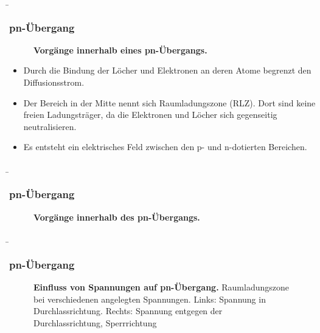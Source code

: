 \begin{frame}
    \b{
    \frametitle{pn-Übergang}
    \begin{figure}[H]
        \centering
        
        \caption{\textbf{Vorgänge innerhalb eines pn-Übergangs.} }  
    \end{figure}
          \begin{itemize}
        \item Durch die Bindung der Löcher und Elektronen an deren Atome begrenzt den Diffusionsstrom.
        \item Der Bereich in der Mitte nennt sich Raumladungszone (RLZ). Dort sind keine freien Ladungsträger, da die Elektronen und Löcher sich gegenseitig neutralisieren.
        \item Es entsteht ein elektrisches Feld zwischen den p- und n-dotierten Bereichen.
    \end{itemize}
    }

\end{frame}

\begin{frame}
    \b{
    \frametitle{pn-Übergang}
    \begin{figure}[H]
        \centering
        
        \caption{\textbf{Vorgänge innerhalb des pn-Übergangs.}}  
    \end{figure}
    }

\end{frame}

\begin{frame}
    \b{
    \frametitle{pn-Übergang}
    \begin{figure}[H]
        \centering
        
        \caption{\textbf{Einfluss von Spannungen auf pn-Übergang.} Raumladungszone bei verschiedenen angelegten Spannungen. Links: Spannung in Durchlassrichtung. Rechts: Spannung entgegen der Durchlassrichtung, Sperrrichtung}  
    \end{figure}
    }

\end{frame}

